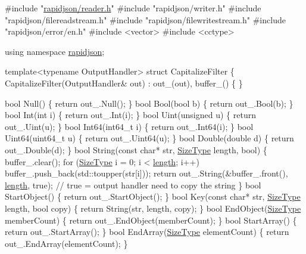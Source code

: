 \begin{DoxyCode}
\textcolor{preprocessor}{#include "\hyperlink{reader_8h}{rapidjson/reader.h}"}
\textcolor{preprocessor}{#include "rapidjson/writer.h"}
\textcolor{preprocessor}{#include "rapidjson/filereadstream.h"}
\textcolor{preprocessor}{#include "rapidjson/filewritestream.h"}
\textcolor{preprocessor}{#include "rapidjson/error/en.h"}
\textcolor{preprocessor}{#include <vector>}
\textcolor{preprocessor}{#include <cctype>}

\textcolor{keyword}{using namespace }\hyperlink{namespacerapidjson}{rapidjson};

\textcolor{keyword}{template}<\textcolor{keyword}{typename} OutputHandler>
\textcolor{keyword}{struct }CapitalizeFilter \{
    CapitalizeFilter(OutputHandler& out) : out\_(out), buffer\_() \{
    \}

    \textcolor{keywordtype}{bool} Null() \{ \textcolor{keywordflow}{return} out\_.Null(); \}
    \textcolor{keywordtype}{bool} Bool(\textcolor{keywordtype}{bool} b) \{ \textcolor{keywordflow}{return} out\_.Bool(b); \}
    \textcolor{keywordtype}{bool} Int(\textcolor{keywordtype}{int} i) \{ \textcolor{keywordflow}{return} out\_.Int(i); \}
    \textcolor{keywordtype}{bool} Uint(\textcolor{keywordtype}{unsigned} u) \{ \textcolor{keywordflow}{return} out\_.Uint(u); \}
    \textcolor{keywordtype}{bool} Int64(int64\_t i) \{ \textcolor{keywordflow}{return} out\_.Int64(i); \}
    \textcolor{keywordtype}{bool} Uint64(uint64\_t u) \{ \textcolor{keywordflow}{return} out\_.Uint64(u); \}
    \textcolor{keywordtype}{bool} Double(\textcolor{keywordtype}{double} d) \{ \textcolor{keywordflow}{return} out\_.Double(d); \}
    \textcolor{keywordtype}{bool} String(\textcolor{keyword}{const} \textcolor{keywordtype}{char}* str, \hyperlink{rapidjson_8h_a5ed6e6e67250fadbd041127e6386dcb5}{SizeType} length, \textcolor{keywordtype}{bool}) \{ 
        buffer\_.clear();
        \textcolor{keywordflow}{for} (\hyperlink{rapidjson_8h_a5ed6e6e67250fadbd041127e6386dcb5}{SizeType} i = 0; i < \hyperlink{group__core__func__geometric_ga03b2831439defb8922832b540b91b8a7}{length}; i++)
            buffer\_.push\_back(std::toupper(str[i]));
        \textcolor{keywordflow}{return} out\_.String(&buffer\_.front(), \hyperlink{group__core__func__geometric_ga03b2831439defb8922832b540b91b8a7}{length}, \textcolor{keyword}{true}); \textcolor{comment}{// true = output handler need to copy the
       string}
    \}
    \textcolor{keywordtype}{bool} StartObject() \{ \textcolor{keywordflow}{return} out\_.StartObject(); \}
    \textcolor{keywordtype}{bool} Key(\textcolor{keyword}{const} \textcolor{keywordtype}{char}* str, \hyperlink{rapidjson_8h_a5ed6e6e67250fadbd041127e6386dcb5}{SizeType} length, \textcolor{keywordtype}{bool} copy) \{ \textcolor{keywordflow}{return} String(str, length, copy); \}
    \textcolor{keywordtype}{bool} EndObject(\hyperlink{rapidjson_8h_a5ed6e6e67250fadbd041127e6386dcb5}{SizeType} memberCount) \{ \textcolor{keywordflow}{return} out\_.EndObject(memberCount); \}
    \textcolor{keywordtype}{bool} StartArray() \{ \textcolor{keywordflow}{return} out\_.StartArray(); \}
    \textcolor{keywordtype}{bool} EndArray(\hyperlink{rapidjson_8h_a5ed6e6e67250fadbd041127e6386dcb5}{SizeType} elementCount) \{ \textcolor{keywordflow}{return} out\_.EndArray(elementCount); \}


\end{DoxyCode}
